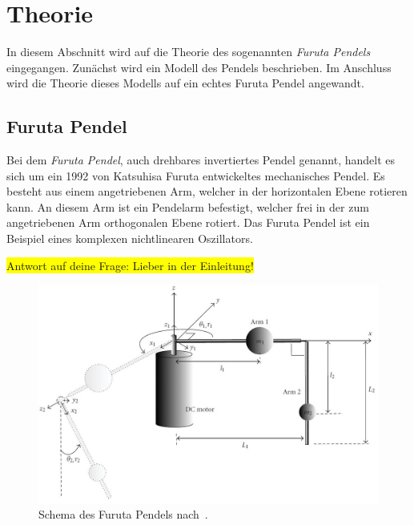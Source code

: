 \section{Theorie}
\label{sec.Theorie}
In diesem Abschnitt wird auf die Theorie des sogenannten \emph{Furuta Pendels} eingegangen. Zunächst wird ein Modell des Pendels beschrieben. Im Anschluss wird die Theorie dieses Modells auf ein echtes Furuta Pendel angewandt. %

\subsection{Furuta Pendel}
\label{sub.Furuta-Pendel}
Bei dem \emph{Furuta Pendel}, auch drehbares invertiertes Pendel genannt, handelt es sich um ein 1992 von Katsuhisa Furuta entwickeltes mechanisches Pendel. 
Es besteht aus einem angetriebenen Arm, welcher in der horizontalen Ebene rotieren kann. 
An diesem Arm ist ein Pendelarm befestigt, welcher frei in der zum angetriebenen Arm orthogonalen Ebene rotiert. 
Das Furuta Pendel ist ein Beispiel eines komplexen nichtlinearen Oszillators. \cite{Cazzolato.2011}

\colorbox{yellow}{Antwort auf deine Frage: Lieber in der Einleitung!}

\begin{figure}[htbp]
	\label{fig.furuta-schematic}
	\centering
	\includegraphics[width=1.\textwidth]{Grafiken/furuta3.jpg}
	\caption{Schema des Furuta Pendels nach~\cite{Cazzolato.2011}. }
\end{figure}

